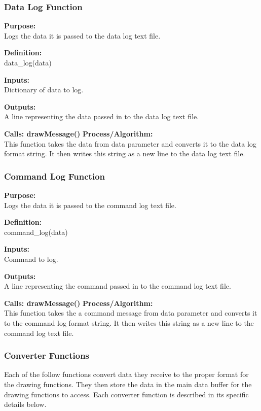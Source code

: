 \documentclass[10pt,draftclsnofoot,onecolumn,retainorgcmds]{IEEEtran}
\begin{document}
\subsubsection{Data Log Function}
{\bf Purpose:} \\
Logs the data it is passed to the data log text file.  \par
{\bf Definition:} \\ 
data\_log(data) \par
{\bf Inputs:} \\ Dictionary of data to log. \par
{\bf Outputs:} \\A line representing the data passed in to the data log text file. \par
{\bf Calls: drawMessage()}
{\bf Process/Algorithm:} \\
This function takes the data from data parameter and converts it to the data log format string. It then writes this string as a new line to the data log text file. \par

\subsubsection{Command Log Function}
{\bf Purpose:} \\
Logs the data it is passed to the command log text file.  \par
{\bf Definition:} \\ 
command\_log(data) \par
{\bf Inputs:} \\ Command to log. \par
{\bf Outputs:} \\A line representing the command passed in to the command log text file. \par
{\bf Calls: drawMessage()}
{\bf Process/Algorithm:} \\
This function takes the a command message from data parameter and converts it to the command log format string. It then writes this string as a new line to the command log text file. \par
\subsubsection{Converter Functions}
Each of the follow functions convert data they receive to the proper format for the drawing functions. They then store the data in the main data buffer for the drawing functions to access.  Each converter function is described in its specific details below. \par
\end{document}
